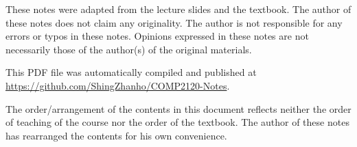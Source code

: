 \begin{remark}
    
These notes were adapted from the lecture slides and the textbook. The author of these notes
does not claim any originality. The author is not responsible for any errors or typos in these notes.
Opinions expressed in these notes are not necessarily those of the author(s) of the original materials.

This PDF file was automatically compiled and published at 
\textcolor{blue}{\url{https://github.com/ShingZhanho/COMP2120-Notes}}.

The order/arrangement of the contents in this document reflects neither the order of
teaching of the course nor the order of the textbook. The author of these notes has
rearranged the contents for his own convenience.

\end{remark}